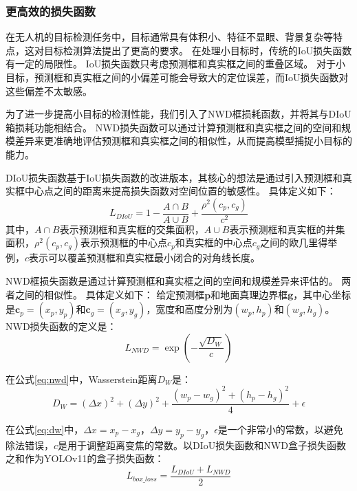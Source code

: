\subsubsection{更高效的损失函数}

在无人机的目标检测任务中，目标通常具有体积小、特征不显眼、背景复杂等特点，这对目标检测算法提出了更高的要求。 在处理小目标时，传统的IoU损失函数有一定的局限性。
IoU损失函数只考虑预测框和真实框之间的重叠区域。 对于小目标，预测框和真实框之间的小偏差可能会导致大的定位误差，而IoU损失函数对这些偏差不太敏感。

为了进一步提高小目标的检测性能，我们引入了NWD框损耗函数，并将其与DIoU箱损耗功能相结合。
NWD损失函数可以通过计算预测框和真实框之间的空间和规模差异来更准确地评估预测框和真实框之间的相似性，从而提高模型捕捉小目标的能力。

DIoU损失函数基于IoU损失函数的改进版本，其核心的想法是通过引入预测框和真实框中心点之间的距离来提高损失函数对空间位置的敏感性。
具体定义如下：
\begin{equation}
    L_{DIoU} = 1 - \frac{A\cap{B}}{A\cup{B}} + \frac{\rho^2(c_p, c_g)}{c^2}
\end{equation}
其中，$A\cap{B}$表示预测框和真实框的交集面积，$A\cup{B}$表示预测框和真实框的并集面积，$\rho^2(c_p, c_g)$表示预测框的中心点$c_p$和真实框的中心点$c_g$之间的欧几里得举例，$c$表示可以覆盖预测框和真实框最小闭合的对角线长度。

NWD框损失函数是通过计算预测框和真实框之间的空间和规模差异来评估的。 两者之间的相似性。
具体定义如下：
给定预测框$\mathbf{p}$和地面真理边界框$\mathbf{g}$，其中心坐标是$\mathbf{c}_p = (x_p, y_p)$和$\mathbf{c}_g = (x_g, y_g)$，宽度和高度分别为$(w_p, h_p)$和$(w_g, h_g)$。 NWD损失函数的定义是：
\begin{equation}
    L_{NWD} = \exp\left(-\frac{\sqrt{D_W}}{c}\right)
    \label{eq:nwd}
\end{equation}

在公式\eqref{eq:nwd}中，Wasserstein距离$D_W$是：
\begin{equation}
    D_W = (\Delta x)^2 + (\Delta y)^2 + \frac{(w_p - w_g)^2 + (h_p - h_g)^2}{4} + \epsilon
    \label{eq:dw}
\end{equation}

在公式\eqref{eq:dw}中，$\Delta x = x_p - x_g$，$\Delta y = y_p - y_g$，$\epsilon$是一个非常小的常数，以避免除法错误，$c$是用于调整距离变焦的常数。以DIoU损失函数和NWD盒子损失函数之和作为YOLOv11的盒子损失函数：
\begin{equation}
    L_{box\_loss} = \frac{L_{DIoU}+L_{NWD}}{2}
\end{equation}

